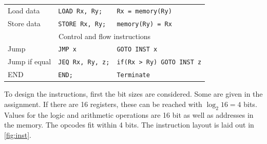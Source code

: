 \documentclass[a4paper, english]{article}
\numberwithin{equation}{section}
\begin{document}
\begin{table}[H]
\begin{tabular}{lll}
        Load data                & \texttt{LOAD Rx, Ry;}    & \texttt{Rx = memory(Ry)}         \\
        Store data               & \texttt{STORE Rx, Ry;}   & \texttt{memory(Ry) = Rx}         \\
        \midrule
        \multicolumn{3}{c}{Control and flow instructions}                                      \\
        \midrule
        Jump                     & \texttt{JMP x}           & \texttt{GOTO INST x}             \\
        Jump if equal            & \texttt{JEQ Rx, Ry, z;}  & \texttt{if(Rx > Ry) GOTO INST z} \\
        END                      & \texttt{END;}            & \texttt{Terminate}               \\
        \bottomrule
    \end{tabular}
\end{table}
To design the instructions, first the bit sizes are considered. Some are given in the assignment. If there are 16 registers, these can be reached with \(\log_2{16} = 4\) bits. Values for the logic and arithmetic operations are 16 bit as well as addresses in the memory. The opcodes fit within 4 bits.\newline
The instruction layout is laid out in \cref{fig:inst}.
\end{document}
